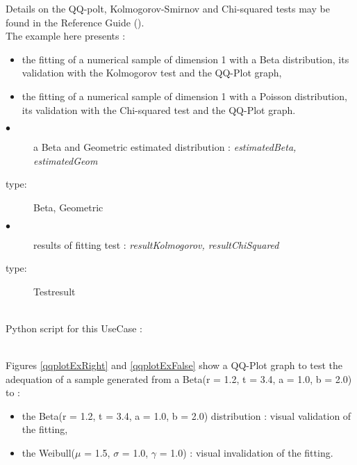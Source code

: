 Details on the QQ-polt, Kolmogorov-Smirnov and  Chi-squared tests may be found in the Reference Guide ().\\


The example here presents :
\begin{itemize}
\item the fitting of a numerical sample of dimension 1 with a Beta distribution, its validation with the Kolmogorov test and the  QQ-Plot graph,
\item the fitting of a numerical sample of dimension 1 with a Poisson distribution, its validation with the Chi-squared test and the  QQ-Plot graph.
\end{itemize}


             {
               \begin{description}
               \item[$\bullet$] a Beta and Geometric estimated  distribution : {\itshape estimatedBeta, estimatedGeom}
               \item[type:] Beta, Geometric
               \end{description}

               \begin{description}
               \item[$\bullet$]  results of fitting test : {\itshape resultKolmogorov, resultChiSquared}
               \item[type:] Testresult
               \end{description}
             }

             \textspace\\
             Python script for this UseCase :


             \textspace\\


             Figures \ref{qqplotExRight} and \ref{qqplotExFalse} show a QQ-Plot graph to test the adequation of a sample generated  from a Beta(r = 1.2, t = 3.4, a = 1.0, b = 2.0) to :
             \begin{itemize}
             \item the Beta(r = 1.2, t = 3.4, a = 1.0, b = 2.0) distribution : visual validation of the fitting,
             \item the Weibull($\mu$ = 1.5, $\sigma$ = 1.0, $\gamma$ = 1.0) : visual invalidation of the fitting.
             \end{itemize}




